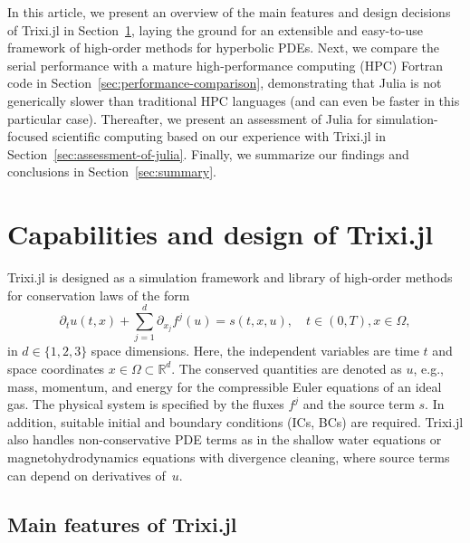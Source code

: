 \documentclass[hidelinks]{juliacon} %
\makeatletter
\newcommand{\eg}[0]{{e.g.\@}\xspace}
\newcommand{\trixi}{Trixi.jl\xspace}
\makeatother
\begin{document}
In this article, we present an overview of the main features and design decisions
of \trixi in Section~\ref{sec:design-of-trixi}, laying the ground for an extensible
and easy-to-use framework of high-order methods for hyperbolic PDEs. Next, we
compare the serial performance with a mature high-performance computing (HPC) Fortran code in
Section~\ref{sec:performance-comparison}, demonstrating that Julia is not generically
slower than traditional HPC languages (and can even be faster in this particular case).
Thereafter, we present an assessment of Julia for simulation-focused scientific
computing based on our experience with \trixi in Section~\ref{sec:assessment-of-julia}.
Finally, we summarize our findings and conclusions in Section~\ref{sec:summary}.



\section{Capabilities and design of Trixi.jl}
\label{sec:design-of-trixi}

\trixi is designed as a simulation framework and library of high-order methods for conservation laws
of the form
\begin{equation}
\label{eq:hcl}
  \partial_t u(t, x) + \sum_{j=1}^d \partial_{x_j} f^j(u) = s(t, x, u),
  \quad t \in (0, T), x \in \Omega,
\end{equation}
in $d \in \{1, 2, 3\}$ space dimensions. Here, the independent variables are
time $t$ and space coordinates $x \in \Omega \subset \mathbb{R}^d$. The conserved
quantities are denoted as $u$, \eg, mass, momentum, and energy for the compressible
Euler equations of an ideal gas.
The physical system is specified by the fluxes $f^j$ and the source term $s$.
In addition, suitable initial and boundary conditions (ICs, BCs) are required.
\trixi also handles non-conservative PDE terms as in the shallow water equations
or magnetohydrodynamics equations with divergence cleaning, where source terms
can depend on derivatives of~$u$.


\subsection{Main features of Trixi.jl}
\end{document}
